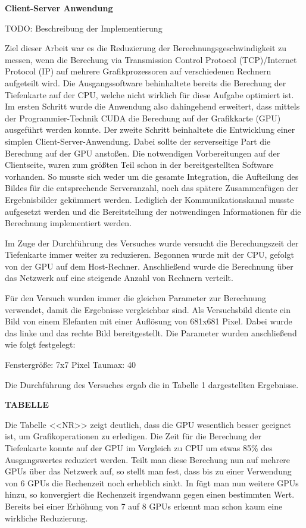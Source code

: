 \documentclass[times, 10pt,twocolumn]{article}
\begin{document}
\textbf{Client-Server Anwendung}

TODO: Beschreibung der Implementierung


Ziel dieser Arbeit war es die Reduzierung der Berechnungsgeschwindigkeit zu messen, wenn die Berechung via Transmission Control Protocol (TCP)/Internet Protocol (IP) auf mehrere Grafikprozessoren auf verschiedenen Rechnern aufgeteilt wird.
Die Ausgangssoftware behinhaltete bereits die Berechung der Tiefenkarte auf der CPU, welche nicht wirklich für diese Aufgabe optimiert ist. Im ersten Schritt wurde die Anwendung also dahingehend erweitert, dass mittels der Programmier-Technik CUDA die Berechung auf der Grafikkarte (GPU) ausgeführt werden konnte.
Der zweite Schritt beinhaltete die Entwicklung einer simplen Client-Server-Anwendung. Dabei sollte der serverseitige Part die Berechung auf der GPU anstoßen. Die notwendigen Vorbereitungen auf der Clientseite, waren zum größten Teil schon in der bereitgestellten Software vorhanden. So musste sich weder um die gesamte Integration, die Aufteilung des Bildes für die entsprechende Serveranzahl, noch das spätere Zusammenfügen der Ergebnisbilder gekümmert werden. Lediglich der Kommunikationskanal musste aufgesetzt werden und die Bereitstellung der notwendingen Informationen für die Berechnung implementiert werden.

Im Zuge der Durchführung des Versuches wurde versucht die Berechungszeit der Tiefenkarte immer weiter zu reduzieren. Begonnen wurde mit der CPU, gefolgt von der GPU auf dem Host-Rechner. Anschließend wurde die Berechnung über das Netzwerk auf eine steigende Anzahl von Rechnern verteilt. 

Für den Versuch wurden immer die gleichen Parameter zur Berechnung verwendet, damit die Ergebnisse vergleichbar sind. Als Versuchsbild diente ein Bild von einem Elefanten mit einer Auflösung von 681x681 Pixel. Dabei wurde das linke und das rechte Bild bereitgestellt. Die Parameter wurden anschließend wie folgt festgelegt:

Fenstergröße: 7x7 Pixel
Taumax: 40

Die Durchführung des Versuches ergab die in Tabelle 1 dargestellten Ergebnisse.

\textbf{TABELLE}

Die Tabelle <<NR>> zeigt deutlich, dass die GPU wesentlich besser geeignet ist, um Grafikoperationen zu erledigen. Die Zeit für die Berechung der Tiefenkarte konnte auf der GPU im Vergleich zu CPU um etwas 85\% des Ausgangswertes reduziert werden. Teilt man diese Berechung nun auf mehrere GPUs über das Netzwerk auf, so stellt man fest, dass bis zu einer Verwendung von 6 GPUs die Rechenzeit noch erheblich sinkt. In fügt man nun weitere GPUs hinzu, so konvergiert die Rechenzeit irgendwann gegen einen bestimmten Wert. Bereits bei einer Erhöhung von 7 auf 8 GPUs erkennt man schon kaum eine wirkliche Reduzierung.
\end{document}
